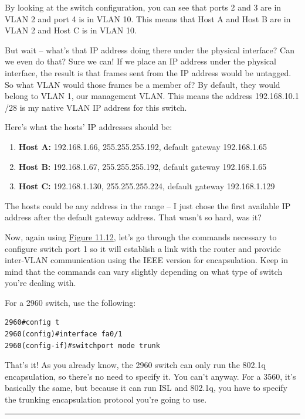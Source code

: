 By looking at the switch configuration, you can see that ports 2 and 3
are in VLAN 2 and port 4 is in VLAN 10. This means that Host A and Host
B are in VLAN 2 and Host C is in VLAN 10.

But wait -- what's that IP address doing there under the physical
interface? Can we even do that? Sure we can! If we place an IP address
under the physical interface, the result is that frames sent from the IP
address would be untagged. So what VLAN would those frames be a member
of? By default, they would belong to VLAN 1, our management VLAN. This
means the address 192.168.10.1 /28 is my native VLAN IP address for this
switch.

Here's what the hosts' IP addresses should be:

\begin{enumerate}
\tightlist
\item
  \textbf{Host A:} 192.168.1.66, 255.255.255.192, default gateway
  192.168.1.65
\item
  \textbf{Host B:} 192.168.1.67, 255.255.255.192, default gateway
  192.168.1.65
\item
  \textbf{Host C:} 192.168.1.130, 255.255.255.224, default gateway
  192.168.1.129
\end{enumerate}

The hosts could be any address in the range -- I just chose the first
available IP address after the default gateway address. That wasn't so
hard, was it?

Now, again using \protect\hyperlink{c11.xhtmlux5cux23figure11-12}{Figure
11.12}, let's go through the commands necessary to configure switch port
1 so it will establish a link with the router and provide inter-VLAN
communication using the IEEE version for encapsulation. Keep in mind
that the commands can vary slightly depending on what type of switch
you're dealing with.

For a 2960 switch, use the following:

\begin{verbatim}
2960#config t
2960(config)#interface fa0/1
2960(config-if)#switchport mode trunk
\end{verbatim}

That's it! As you
already know, the 2960 switch can only run the 802.1q encapsulation, so
there's no need to specify it. You can't anyway. For a 3560, it's
basically the same, but because it can run ISL and 802.1q, you have to
specify the trunking encapsulation protocol you're going to use.

\begin{center}\rule{0.5\linewidth}{0.5pt}\end{center}

